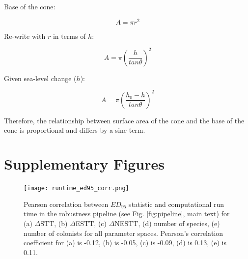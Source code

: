 Base of the cone: 

\[ A = \pi r^2 \]

Re-write with $r$ in terms of $h$:

\[ A = \pi \left( \frac{h}{tan \theta} \right)^2 \]

Given sea-level change ($h$): 

\[ A = \pi \left( \frac{h_0 - h}{tan \theta} \right) ^2 \]

Therefore, the relationship between surface area of the cone and the base of the cone is proportional and differs by a sine term.

\clearpage

\section*{Supplementary Figures}

\begin{figure}[ht]
    \centering
    \texttt{[image: runtime\_ed95\_corr.png]}
    \caption{Pearson correlation between $ED_{95}$ statistic and computational run time in the robustness pipeline (see Fig. \ref{fig:pipeline}, main text) for (a) $\Delta$STT, (b) $\Delta$ESTT, (c) $\Delta$NESTT, (d) number of species, (e) number of colonists for all parameter spaces. Pearson’s correlation coefficient for (a) is -0.12, (b) is -0.05, (c) is -0.09, (d) is 0.13, (e) is 0.11.}
    \label{fig:runtime_ed95_corr}
\end{figure}

